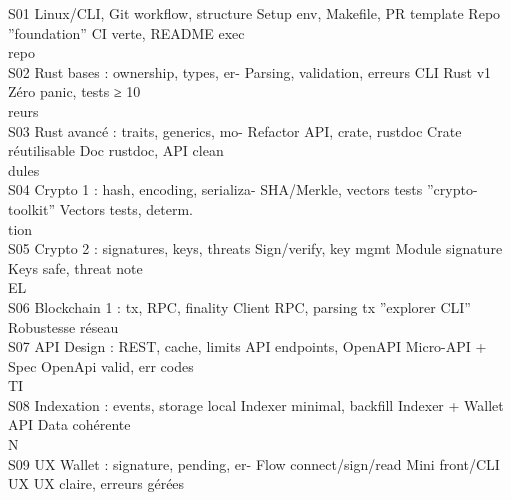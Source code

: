 S01    Linux/CLI, Git workflow, structure Setup env, Makefile, PR template   Repo ”foundation”         CI verte, README exec\\
repo\\
S02    Rust bases : ownership, types, er- Parsing, validation, erreurs       CLI Rust v1               Zéro panic, tests ≥ 10\\
reurs\\
S03    Rust avancé : traits, generics, mo- Refactor API, crate, rustdoc      Crate réutilisable        Doc rustdoc, API clean\\
dules\\
S04    Crypto 1 : hash, encoding, serializa- SHA/Merkle, vectors tests       ”crypto-toolkit”          Vectors tests, determ.\\
tion\\
S05    Crypto 2 : signatures, keys, threats Sign/verify, key mgmt            Module signature          Keys safe, threat note\\
\vspace{0.5em}
\vspace{0.5em}
\vspace{0.5em}
\vspace{0.5em}
EL\\
S06    Blockchain 1 : tx, RPC, finality      Client RPC, parsing tx          ”explorer CLI”            Robustesse réseau\\
S07    API Design : REST, cache, limits      API endpoints, OpenAPI          Micro-API + Spec          OpenApi valid, err codes\\
\vspace{0.5em}
\vspace{0.5em}
\vspace{0.5em}
\vspace{0.5em}
TI\\
S08    Indexation : events, storage local    Indexer minimal, backfill       Indexer + Wallet API      Data cohérente\\
\vspace{0.5em}
\vspace{0.5em}
\vspace{0.5em}
\vspace{0.5em}
N\\
S09    UX Wallet : signature, pending, er- Flow connect/sign/read            Mini front/CLI UX         UX claire, erreurs gérées\\
\vspace{0.5em}
\vspace{0.5em}
\vspace{0.5em}
